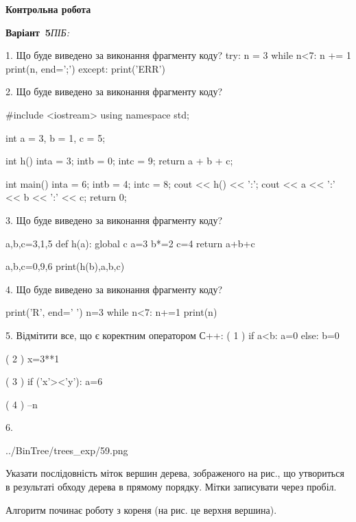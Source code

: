 \documentclass[11pt]{article}
\begin{document}
{\large\textbf{Контрольна робота}}

\textbf{Варіант \No\,5}\hfill \textit{ПІБ:}\,\underline{\hspace{60mm}}
\vspace{4mm}

1. Що буде виведено за виконання фрагменту коду?
try:
    n = 3
    while n<7:
        n += 1
    print(n, end=';')
except:
    print('ERR')
\vspace{5mm}

2. Що буде виведено за виконання фрагменту коду?

#include <iostream>
using namespace std;

int a = 3, b = 1, c = 5;

int h(){
    inta = 3;
    intb = 0;
    intc = 9;
    return a + b + c;
}

int main(){
    inta = 6;
    intb = 4;
    intc = 8;
    cout << h() << ':';
    cout << a << ':' << b << ':' << c;
    return 0;
}
\vspace{5mm}

3. Що буде виведено за виконання фрагменту коду?

a,b,c=3,1,5
def h(a):
global c    a=3
    b*=2
    c=4
    return a+b+c

a,b,c=0,9,6
print(h(b),a,b,c)
\vspace{5mm}

4. Що буде виведено за виконання фрагменту коду?

print('R', end=' ')
n=3
while n<7:
    n+=1
print(n)

\vspace{5mm}

5. %
Відмітити все, що є коректним оператором С++:
( 1 ) if a<b: a=0 else: b=0

( 2 ) x=3**1

( 3 ) if ('x'><'y'): a=6

( 4 ) --n
\vspace{5mm}

6. 

\begin{center}
	{../BinTree/trees_exp/59.png}
\end{center}
Указати послідовність міток вершин дерева, зображеного на рис., що утвориться в результаті обходу дерева в прямому порядку. Мітки записувати через пробіл.\par Алгоритм починає роботу з кореня (на рис. це верхня вершина).
\vspace{5mm}
\end{document}
